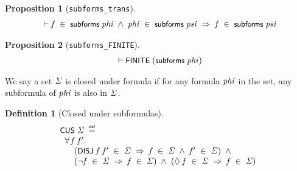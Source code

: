 \documentclass[letterpaper]{article}
\newtheorem{defn}{Definition}
\newtheorem{prop}{Proposition}
\renewcommand{\HOLConst}[1]{{\textsf{\upshape\small #1}}}
\renewcommand{\HOLinline}[1]{\ensuremath{#1}}
\newenvironment{holmath}{\begin{displaymath}\begin{array}{l}}{\end{array}\end{displaymath}\ignorespacesafterend}
\begin{document}
\begin{prop}[\texttt{subforms_trans}]
\begin{holmath}
  \ensuremath{\HOLTokenTurnstile}\HOLFreeVar{f}\;\HOLSymConst{\HOLTokenIn{}}\;\HOLConst{subforms}\;\HOLFreeVar{phi}\;\HOLSymConst{\HOLTokenConj{}}\;\HOLFreeVar{phi}\;\HOLSymConst{\HOLTokenIn{}}\;\HOLConst{subforms}\;\HOLFreeVar{psi}\;\HOLSymConst{\HOLTokenImp{}}\;\HOLFreeVar{f}\;\HOLSymConst{\HOLTokenIn{}}\;\HOLConst{subforms}\;\HOLFreeVar{psi}
\end{holmath}
\end{prop}

\begin{prop}[\texttt{subforms_FINITE}]
\begin{holmath}
  \ensuremath{\HOLTokenTurnstile}\HOLConst{FINITE}\;(\HOLConst{subforms}\;\HOLFreeVar{phi})
\end{holmath}
\end{prop}

We say a set \HOLinline{\HOLFreeVar{\ensuremath{\Sigma}}} is closed under formula if for any formula \HOLinline{\HOLFreeVar{phi}} in the set, any subformula of \HOLinline{\HOLFreeVar{phi}} is also in \HOLinline{\HOLFreeVar{\ensuremath{\Sigma}}}.
\begin{defn}[Closed under subformulas]
\begin{holmath}
  \HOLConst{CUS}\;\HOLFreeVar{\ensuremath{\Sigma}}\;\HOLSymConst{\HOLTokenDefEquality{}}\\
\;\;\HOLSymConst{\HOLTokenForall{}}\HOLBoundVar{f}\;\HOLBoundVar{f\sp{\prime}}.\\
\;\;\;\;\;\;(\HOLConst{DISJ}\;\HOLBoundVar{f}\;\HOLBoundVar{f\sp{\prime}}\;\HOLSymConst{\HOLTokenIn{}}\;\HOLFreeVar{\ensuremath{\Sigma}}\;\HOLSymConst{\HOLTokenImp{}}\;\HOLBoundVar{f}\;\HOLSymConst{\HOLTokenIn{}}\;\HOLFreeVar{\ensuremath{\Sigma}}\;\HOLSymConst{\HOLTokenConj{}}\;\HOLBoundVar{f\sp{\prime}}\;\HOLSymConst{\HOLTokenIn{}}\;\HOLFreeVar{\ensuremath{\Sigma}})\;\HOLSymConst{\HOLTokenConj{}}\\
\;\;\;\;\;\;(\HOLSymConst{\HOLTokenNeg{}}\HOLBoundVar{f}\;\HOLSymConst{\HOLTokenIn{}}\;\HOLFreeVar{\ensuremath{\Sigma}}\;\HOLSymConst{\HOLTokenImp{}}\;\HOLBoundVar{f}\;\HOLSymConst{\HOLTokenIn{}}\;\HOLFreeVar{\ensuremath{\Sigma}})\;\HOLSymConst{\HOLTokenConj{}}\;(\HOLSymConst{\ensuremath{\Diamond}}\;\HOLBoundVar{f}\;\HOLSymConst{\HOLTokenIn{}}\;\HOLFreeVar{\ensuremath{\Sigma}}\;\HOLSymConst{\HOLTokenImp{}}\;\HOLBoundVar{f}\;\HOLSymConst{\HOLTokenIn{}}\;\HOLFreeVar{\ensuremath{\Sigma}})
\end{holmath}
\end{defn}
\end{document}
